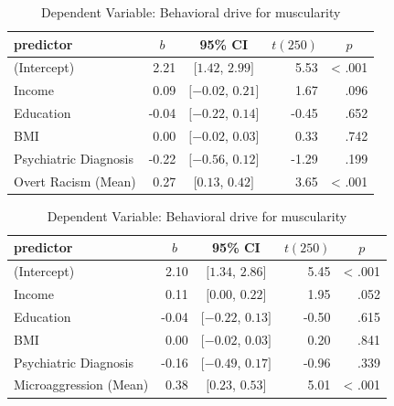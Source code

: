 \documentclass[
  english,
  man, fleqn, noextraspace,floatsintext]{apa6}
\begin{document}
\begin{table}[tbp]

\begin{center}
\begin{threeparttable}

\caption{\label{tab:regression-table}Dependent Variable: Behavioral drive for muscularity}

\begin{tabular}{lrcrr}
\toprule
predictor & \multicolumn{1}{c}{$b$} & \multicolumn{1}{c}{95\% CI} & \multicolumn{1}{c}{$t(250)$} & \multicolumn{1}{c}{$p$}\\
\midrule
(Intercept) & 2.21 & $[1.42$, $2.99]$ & 5.53 & < .001\\
Income & 0.09 & $[-0.02$, $0.21]$ & 1.67 & .096\\
Education & -0.04 & $[-0.22$, $0.14]$ & -0.45 & .652\\
BMI & 0.00 & $[-0.02$, $0.03]$ & 0.33 & .742\\
Psychiatric Diagnosis & -0.22 & $[-0.56$, $0.12]$ & -1.29 & .199\\
Overt Racism (Mean) & 0.27 & $[0.13$, $0.42]$ & 3.65 & < .001\\
\bottomrule
\end{tabular}

\end{threeparttable}
\end{center}

\end{table}

\begin{table}[tbp]

\begin{center}
\begin{threeparttable}

\caption{\label{tab:regression-table}Dependent Variable: Behavioral drive for muscularity}

\begin{tabular}{lrcrr}
\toprule
predictor & \multicolumn{1}{c}{$b$} & \multicolumn{1}{c}{95\% CI} & \multicolumn{1}{c}{$t(250)$} & \multicolumn{1}{c}{$p$}\\
\midrule
(Intercept) & 2.10 & $[1.34$, $2.86]$ & 5.45 & < .001\\
Income & 0.11 & $[0.00$, $0.22]$ & 1.95 & .052\\
Education & -0.04 & $[-0.22$, $0.13]$ & -0.50 & .615\\
BMI & 0.00 & $[-0.02$, $0.03]$ & 0.20 & .841\\
Psychiatric Diagnosis & -0.16 & $[-0.49$, $0.17]$ & -0.96 & .339\\
Microaggression (Mean) & 0.38 & $[0.23$, $0.53]$ & 5.01 & < .001\\
\bottomrule
\end{tabular}

\end{threeparttable}
\end{center}

\end{table}
\end{document}
